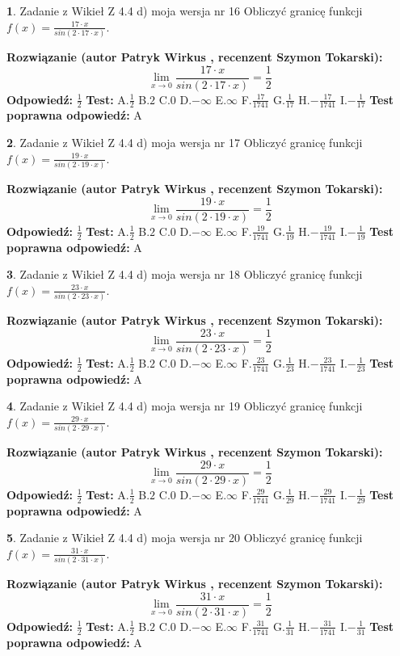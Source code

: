 \documentclass[12pt, a4paper]{article}
\theoremstyle{definition} %
\newtheorem{zad}{}
\newcommand{\zadStart}[1]{\begin{zad}#1\newline}
\newcommand{\zadStop}{\end{zad}}
\newcommand{\rozwStart}[2]{\noindent \textbf{Rozwiązanie (autor #1 , recenzent #2): }\newline}
\newcommand{\rozwStop}{\newline}
\newcommand{\odpStart}{\noindent \textbf{Odpowiedź:}\newline}
\newcommand{\odpStop}{\newline}
\newcommand{\testStart}{\noindent \textbf{Test:}\newline}
\newcommand{\testStop}{\newline}
\newcommand{\kluczStart}{\noindent \textbf{Test poprawna odpowiedź:}\newline}
\newcommand{\kluczStop}{\newline}
\begin{document}
\zadStart{Zadanie z Wikieł Z 4.4 d) moja wersja nr 16}
Obliczyć granicę funkcji $f(x)=\frac{17\cdot x}{sin(2 \cdot17\cdot x)}$.
\zadStop
\rozwStart{Patryk Wirkus}{Szymon Tokarski}
$$\lim\limits_{x\to 0}\frac{17\cdot x}{sin(2 \cdot17\cdot x)}=\frac{1}{2}$$
\rozwStop
\odpStart
$\frac{1}{2}$
\odpStop
\testStart
A.$\frac{1}{2}$
B.$2$
C.$0$
D.$-\infty$
E.$\infty$
F.$\frac{17}{1741}$
G.$\frac{1}{17}$
H.$-\frac{17}{1741}$
I.$-\frac{1}{17}$
\testStop
\kluczStart
A
\kluczStop



\zadStart{Zadanie z Wikieł Z 4.4 d) moja wersja nr 17}
Obliczyć granicę funkcji $f(x)=\frac{19\cdot x}{sin(2 \cdot19\cdot x)}$.
\zadStop
\rozwStart{Patryk Wirkus}{Szymon Tokarski}
$$\lim\limits_{x\to 0}\frac{19\cdot x}{sin(2 \cdot19\cdot x)}=\frac{1}{2}$$
\rozwStop
\odpStart
$\frac{1}{2}$
\odpStop
\testStart
A.$\frac{1}{2}$
B.$2$
C.$0$
D.$-\infty$
E.$\infty$
F.$\frac{19}{1741}$
G.$\frac{1}{19}$
H.$-\frac{19}{1741}$
I.$-\frac{1}{19}$
\testStop
\kluczStart
A
\kluczStop



\zadStart{Zadanie z Wikieł Z 4.4 d) moja wersja nr 18}
Obliczyć granicę funkcji $f(x)=\frac{23\cdot x}{sin(2 \cdot23\cdot x)}$.
\zadStop
\rozwStart{Patryk Wirkus}{Szymon Tokarski}
$$\lim\limits_{x\to 0}\frac{23\cdot x}{sin(2 \cdot23\cdot x)}=\frac{1}{2}$$
\rozwStop
\odpStart
$\frac{1}{2}$
\odpStop
\testStart
A.$\frac{1}{2}$
B.$2$
C.$0$
D.$-\infty$
E.$\infty$
F.$\frac{23}{1741}$
G.$\frac{1}{23}$
H.$-\frac{23}{1741}$
I.$-\frac{1}{23}$
\testStop
\kluczStart
A
\kluczStop



\zadStart{Zadanie z Wikieł Z 4.4 d) moja wersja nr 19}
Obliczyć granicę funkcji $f(x)=\frac{29\cdot x}{sin(2 \cdot29\cdot x)}$.
\zadStop
\rozwStart{Patryk Wirkus}{Szymon Tokarski}
$$\lim\limits_{x\to 0}\frac{29\cdot x}{sin(2 \cdot29\cdot x)}=\frac{1}{2}$$
\rozwStop
\odpStart
$\frac{1}{2}$
\odpStop
\testStart
A.$\frac{1}{2}$
B.$2$
C.$0$
D.$-\infty$
E.$\infty$
F.$\frac{29}{1741}$
G.$\frac{1}{29}$
H.$-\frac{29}{1741}$
I.$-\frac{1}{29}$
\testStop
\kluczStart
A
\kluczStop



\zadStart{Zadanie z Wikieł Z 4.4 d) moja wersja nr 20}
Obliczyć granicę funkcji $f(x)=\frac{31\cdot x}{sin(2 \cdot31\cdot x)}$.
\zadStop
\rozwStart{Patryk Wirkus}{Szymon Tokarski}
$$\lim\limits_{x\to 0}\frac{31\cdot x}{sin(2 \cdot31\cdot x)}=\frac{1}{2}$$
\rozwStop
\odpStart
$\frac{1}{2}$
\odpStop
\testStart
A.$\frac{1}{2}$
B.$2$
C.$0$
D.$-\infty$
E.$\infty$
F.$\frac{31}{1741}$
G.$\frac{1}{31}$
H.$-\frac{31}{1741}$
I.$-\frac{1}{31}$
\testStop
\kluczStart
A
\kluczStop
\end{document}
